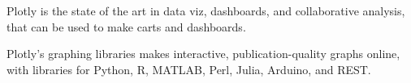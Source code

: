 \documentclass{beamer}
\begin{document}
	\begin{frame}
		
		Plotly is the state of the art in data viz, dashboards, and collaborative analysis, that can be used to make carts and dashboards.
		
	\end{frame}
	\begin{frame}
		
		Plotly's graphing libraries makes interactive, publication-quality graphs online, with libraries for Python, R, MATLAB, Perl, Julia, Arduino, and REST.
		
		
	\end{frame}
\end{document}

